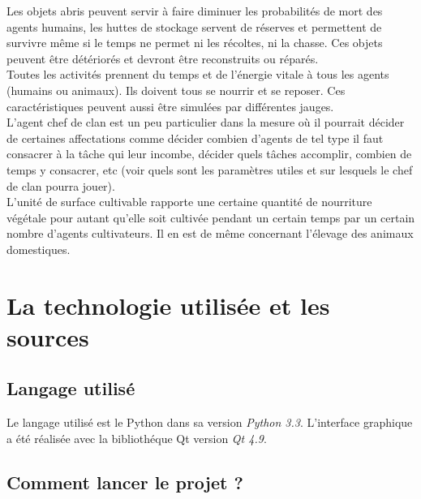 \documentclass[12pt]{article}
\begin{document}
Les objets abris peuvent servir à faire diminuer les probabilités de mort des 
agents humains, les huttes de stockage servent de réserves et permettent de 
survivre même si le temps ne permet ni les récoltes, ni la chasse. Ces objets 
peuvent être détériorés et devront être reconstruits ou réparés.\\

Toutes les activités prennent du temps et de l'énergie vitale à tous les agents 
(humains ou animaux). Ils doivent tous se nourrir et se reposer. Ces 
caractéristiques peuvent aussi être simulées par différentes jauges.\\

L'agent chef de clan est un peu particulier dans la mesure où il pourrait 
décider de certaines affectations comme décider combien d'agents de tel type 
il faut consacrer à la tâche qui leur incombe, décider quels tâches accomplir, 
combien de temps y consacrer, etc (voir quels sont les paramètres utiles et 
sur lesquels le chef de clan pourra jouer).\\

L'unité de surface cultivable rapporte une certaine quantité de nourriture 
végétale pour autant qu'elle soit cultivée pendant un certain temps par un 
certain nombre d'agents cultivateurs. Il en est de même concernant l'élevage 
des animaux domestiques.\\



\section{La technologie utilisée et les sources}

	\subsection{Langage utilisé}

Le langage utilisé est le Python dans sa version \textit{Python 3.3}. 
L'interface graphique a été réalisée avec la bibliothéque Qt version \textit{Qt 
4.9}.

	\subsection{Comment lancer le projet ?}
\end{document}
